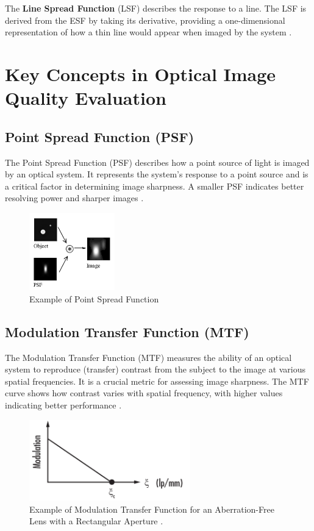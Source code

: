 The \textbf{Line Spread Function} (LSF) describes the response to a line. The LSF is derived from the ESF by taking its derivative, providing a one-dimensional representation of how a thin line would appear when imaged by the system \cite{ESF}.

\section{Key Concepts in Optical Image Quality Evaluation}

\subsection{Point Spread Function (PSF)}
The Point Spread Function (PSF) describes how a point source of light is imaged by an optical system. It represents the system's response to a point source and is a critical factor in determining image sharpness. A smaller PSF indicates better resolving power and sharper images \cite{PSFdescription}.

\begin{figure}[h]
\centering
\includegraphics[width=3.7cm]{Images/psf.png}
\caption{Example of Point Spread Function \cite{PSF}}
\label{fig:psf}
\end{figure}

\subsection{Modulation Transfer Function (MTF)}
The Modulation Transfer Function (MTF) measures the ability of an optical system to reproduce (transfer) contrast from the subject to the image at various spatial frequencies. It is a crucial metric for assessing image sharpness. The MTF curve shows how contrast varies with spatial frequency, with higher values indicating better performance \cite{MTF}.

\begin{figure}[h]
\centering
\includegraphics[height=3.5cm]{Images/MTF_example.png}
\caption{Example of Modulation Transfer Function for an Aberration-Free Lens with a Rectangular Aperture \cite{MTFimage}.}
\label{fig:mtf}
\end{figure}

